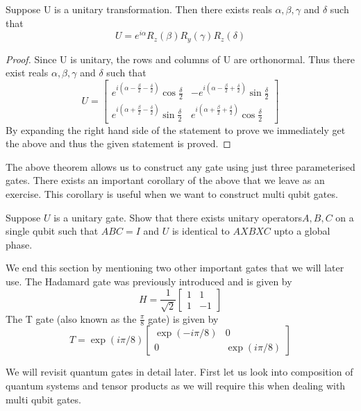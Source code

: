 \begin{theorem}
Suppose U is a unitary transformation. Then there exists reals $\alpha, \beta, \gamma$ and $\delta$ such that 
$$ U = e^{i\alpha}R_z(\beta)R_y(\gamma)R_z(\delta)$$
\end{theorem}

\begin{proof}
Since U is unitary, the rows and columns of U are orthonormal. Thus there exist reals $\alpha, \beta, \gamma$ and $\delta$ such that 
$$U = \begin{bmatrix}e^{i(\alpha - \frac{\beta}{2} - \frac{\delta}{2})}\cos{\frac{\delta}{2}} & -e^{i(\alpha - \frac{\beta}{2} + \frac{\delta}{2})}\sin{\frac{\delta}{2}} \\e^{i(\alpha + \frac{\beta}{2} - \frac{\delta}{2})}\sin{\frac{\delta}{2}}& e^{i(\alpha + \frac{\beta}{2} + \frac{\delta}{2})}\cos{\frac{\delta}{2}}
\end{bmatrix}
$$
By expanding the right hand side of the statement to prove we immediately get the above and thus the given statement is proved.
\end{proof}

The above theorem allows us to construct any gate using just three parameterised gates. There exists an important corollary of the above that we leave as an exercise. This corollary is useful when we want to construct multi qubit gates.

\begin{exercise}
Suppose $U$ is a unitary gate. Show that there exists unitary operators$A, B, C$ on a single qubit such that $ABC=I$ and $U$ is identical to $AXBXC$ upto a global phase.
\end{exercise}

We end this section by mentioning two other important gates that we will later use.
The Hadamard gate was previously introduced and is given by 
$$H = \frac{1}{\sqrt{2}}\begin{bmatrix}1 & 1 \\ 1&-1 \end{bmatrix} $$
The T gate (also known as the $\frac{\pi}{8}$ gate) is given by 
$$ T = \exp(i\pi/8)\begin{bmatrix} \exp(-i\pi/8) & 0 \\ 0 & \exp(i\pi/8) \end{bmatrix}$$

We will revisit quantum gates in detail later. First let us look into composition of quantum systems and tensor products as we will require this when dealing with multi qubit gates.

\clearpage